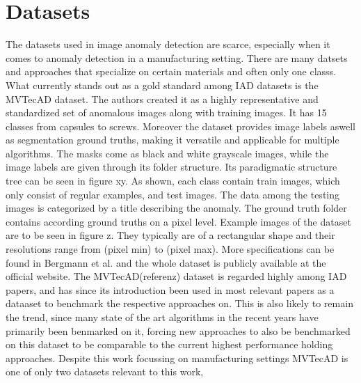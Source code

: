 


\section{Datasets}
\label{sec:datasets}
The datasets used in image anomaly detection are scarce, especially when it comes to anomaly detection in a manufacturing setting. There are many datsets and approaches that specialize on certain materials \cite{FabricDataset_Tsang_2016} 
\cite{SteeltubeDataset_Yang_2021} \cite{magnetictiles_Huang_2018}
and often only one classs. What currently stands out as a gold standard among IAD datasets is the MVTecAD \cite{MVTEC_Bergmann_2021} dataset. The authors created it  
as a highly representative and standardized set of anomalous images along with training images. It has 15 classes from capsules to screws. Moreover the dataset provides image labels aswell as segmentation 
ground truths, making it versatile and applicable for multiple algorithms. The masks come as black and white grayscale images, while the image labels are given through its folder structure. 
Its paradigmatic structure tree can be seen in figure xy. As shown, each class contain train images, which only consist of regular examples, 
and test images. The data among the testing images is categorized by a title describing the anomaly. The ground truth folder contains 
according ground truths on a pixel level. Example images of the dataset are to be seen in figure z. They typically are of a rectangular shape and their resolutions range from 
(pixel min) to (pixel max). More specifications can be found in Bergmann et al. \cite{MVTEC_Bergmann_2021} and the whole dataset is publicly available at the official website\cite{mvtecdownload}.\newline
The MVTecAD(referenz) dataset is regarded highly among IAD papers, and has since its introduction been used in most relevant papers as a dataaset 
to benchmark the respective approaches on. This is also likely to remain the trend, since many state of the art algorithms in the recent years have primarily been benmarked on it, forcing new approaches 
to also be benchmarked on this dataset to be comparable to the current highest performance holding approaches. Despite this work focussing on manufacturing settings MVTecAD is one of only two datasets relevant to this work, 
